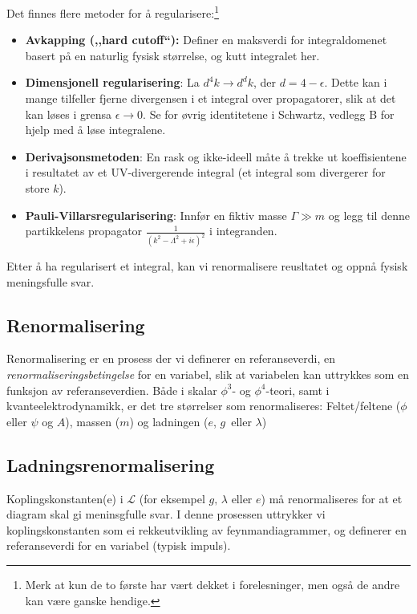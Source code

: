 \documentclass{article}
\renewcommand{\L}{\mathcal{L}}
\begin{document}
Det finnes flere metoder for å regularisere:\footnote{
    Merk at kun de to første har vært dekket i forelesninger, men også de andre kan være ganske hendige.
}
\begin{itemize}
    \item \textbf{Avkapping (,,hard cutoff``):} Definer en maksverdi for integraldomenet basert på en naturlig fysisk størrelse, og kutt integralet her.
    \item \textbf{Dimensjonell regularisering}: La $d^4k \rightarrow d^dk$, der $d = 4-\epsilon$. 
        Dette kan i mange tilfeller fjerne divergensen i et integral over propagatorer, slik at det kan løses i grensa $\epsilon \rightarrow 0$.
        Se for øvrig identitetene i Schwartz, vedlegg B for hjelp med å løse integralene.
    \item \textbf{Derivajsonsmetoden}: En rask og ikke-ideell måte å trekke ut koeffisientene i resultatet av et UV-divergerende integral (et integral som divergerer for store $k$).
    \item \textbf{Pauli-Villarsregularisering}: Innfør en fiktiv masse $\Gamma \gg m$ og legg til denne partikkelens propagator $\frac{1}{(k^2 - \Lambda^2 +i\epsilon)^2}$ i integranden.
\end{itemize}

Etter å ha regularisert et integral, kan vi renormalisere reusltatet og oppnå fysisk meningsfulle svar.

\subsection{Renormalisering}
Renormalisering er en prosess der vi definerer en referanseverdi, en \emph{renormaliseringsbetingelse} for en variabel, slik at variabelen kan uttrykkes som en funksjon av referanseverdien.
Både i skalar $\phi^3$- og $\phi^4$-teori, samt i kvanteelektrodynamikk, er det tre størrelser som renormaliseres:
Feltet/feltene ($\phi$ eller $\psi$ og $A$), massen ($m$) og ladningen ($e$, $g$ eller $\lambda$) 


\subsection{Ladningsrenormalisering}
Koplingskonstanten(e) i $\L$ (for eksempel $g, \, \lambda$ eller $e$) må renormaliseres for at et diagram skal gi meninsgfulle svar. 
I denne prosessen uttrykker vi koplingskonstanten som ei rekkeutvikling av feynmandiagrammer, og definerer en referanseverdi for en variabel (typisk impuls).
\end{document}
